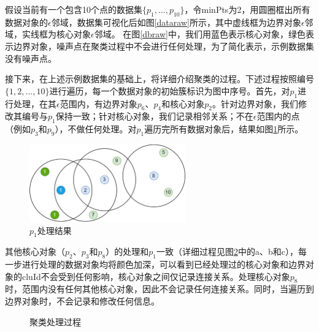 假设当前有一个包含10个点的数据集$ \{p_1,...,p_{10}\} $，令minPts为2，用圆圈框出所有数据对象的$ \epsilon $邻域，数据集可视化后如图\ref{dataraw}所示，其中虚线框为边界对象$ \epsilon $邻域，实线框为核心对象$ \epsilon $邻域。
在图\ref{dbraw}中，我们用蓝色表示核心对象，绿色表示边界对象，噪声点在聚类过程中不会进行任何处理，为了简化表示，示例数据集没有噪声点。

接下来，在上述示例数据集的基础上，将详细介绍聚类的过程。下述过程按照编号$ \{1,2,...,10\} $进行遍历，每一个数据对象的初始簇标识为图中序号。首先，对$ p_1 $进行处理，在其$ \epsilon $范围内，有边界对象$ p_6$、$p_4 $和核心对象$ p_2 $。针对边界对象，我们修改其编号与$ p_1 $保持一致；针对核心对象，我们记录相邻关系；不在$ \epsilon $范围内的点（例如$ p_3 $和$ p_9 $），不做任何处理。对$ p_1 $遍历完所有数据对象后，结果如图\ref{db_one}所示。

\begin{figure}[htbp]
	\centering
	\includegraphics[width=0.6\textwidth]{img/db2.png}
	\caption{$ p_1 $处理结果}
	\label{db_one}
\end{figure}

其他核心对象（$ p_2 $、$ p_3 $和$ p_8 $）的处理和$ p_1 $一致（详细过程见图\ref{db_process}中的a、b和c），每一步进行处理的数据对象均将颜色加深，可以看到已经处理过的核心对象和边界对象的cluId不会受到任何影响，核心对象之间仅记录连接关系。处理核心对象$ p_8 $时，范围内没有任何其他核心对象，因此不会记录任何连接关系。同时，当遍历到边界对象时，不会记录和修改任何信息。

\begin{figure}[htbp]
	\centering
	\caption{聚类处理过程}
	\label{db_process}
\end{figure}

